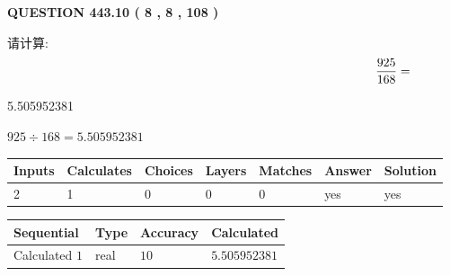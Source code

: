 \documentclass{ctexart}
\begin{document}
   
  
\vspace{0.2in}
  
{\textbf{\Large{QUESTION
443.10 
 ( 8 , 8 , 108 )
}}}
  
  
 
请计算:
\begin{equation}
\frac { %
925 }  {  %
168} = \nonumber
\end{equation}
 
 
 
\noindent{}
 
 

5.505952381
 
 
\noindent{}
 
 

 
 
 
\noindent{}
 
 

$ %
925 \div  %
168=   %
5.505952381$
 
 
\noindent{}
 
 

 
   
   
   
   
\noindent\begin{tabular}{|l|l|l|l|l|l|l|}
 \hline
Inputs & Calculates & Choices & Layers & Matches & Answer & Solution \\ \hline
 2  & 
 1  & 
 0
  & 
 0  & 
 0  & 
  yes & 
  yes 
  \\ \hline
 \end{tabular}
   
   
   
   
\noindent{}
   
   
  
  
\noindent\begin{tabular}{|l|l|l|l|}
\hline
 Sequential & Type & Accuracy & Calculated \\ 
\hline
 
 
  Calculated $  1 $ & real & $  10  $ & 
 $ 5.505952381 $ 
 \\  \hline  
 \end{tabular}
   
\end{document}
